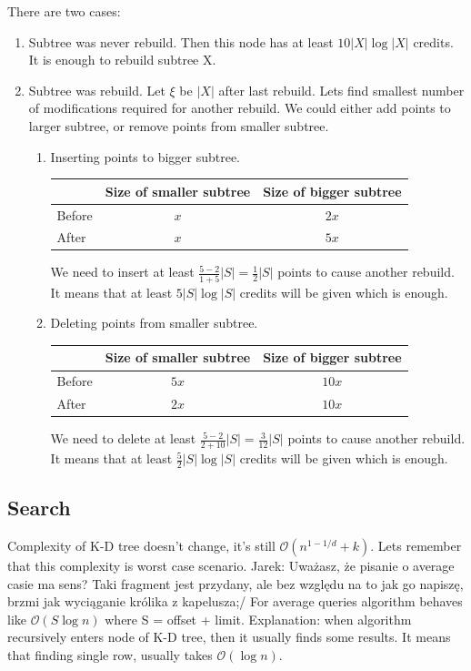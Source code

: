 \documentclass[10pt,a4paper]{article}
\newcommand{\jarek}[1]{\noindent\colorbox{myYellow}{Jarek: #1}}
\newcommand{\Oh}{\mathcal{O}}
\begin{document}
There are two cases:
\begin{enumerate}
\item Subtree was never rebuild. Then this node has at least $10 |X| \log |X|$ credits. It is enough to rebuild subtree X.
\item Subtree was rebuild. Let $\xi$ be $|X|$ after last rebuild. Lets find smallest number of modifications required for another rebuild. We could either add points to larger subtree, or remove points from smaller subtree.
\begin{enumerate}
\item Inserting points to bigger subtree.

\begin{tabular}{|l|c|c|}
\hline  & Size of smaller subtree & Size of bigger subtree  \\
\hline Before & $x$ & $2x$ \\
\hline After & $x$ & $5x$ \\
\hline 
\end{tabular}

We need to insert at least $ \frac{5 - 2}{1 + 5} |S| = \frac{1}{2} |S|$ points to cause another rebuild. It means that at least $5 |S| \log |S|$ credits will be given which is enough. 

\bigskip
\item Deleting points from smaller subtree.

\begin{tabular}{|l|c|c|}
\hline  & Size of smaller subtree & Size of bigger subtree  \\
\hline Before & $5x$ & $10x$ \\
\hline After & $2x$ & $10x$ \\
\hline 
\end{tabular}

We need to delete at least $\frac{5 - 2}{2 + 10} |S| = \frac{3}{12} |S|$ points to cause another rebuild. It means that at least $\frac{5}{2} |S| \log |S|$ credits will be given which is enough. 

\end{enumerate}
\end{enumerate}

\subsection{Search}
Complexity of K-D tree doesn't change, it's still $\Oh(n^{1-1/d} + k)$. Lets remember that this complexity is worst case scenario. \jarek{Uważasz, że pisanie o average casie ma sens? Taki fragment jest przydany, ale bez względu na to jak go napiszę, brzmi jak wyciąganie królika z kapelusza;/} For average queries algorithm behaves like $\Oh(S \log n)$ where S = offset + limit. Explanation: when algorithm recursively enters node of K-D tree, then it usually finds some results. It means that finding single row, usually takes $\Oh(\log n)$.
\end{document}
